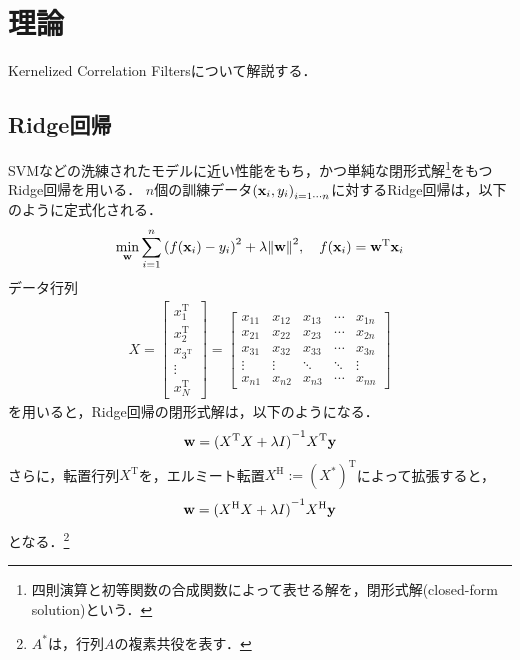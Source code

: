 \documentclass[11pt,a4j]{jarticle}
\newcommand\norm[1]{\left\lVert#1\right\rVert}
\begin{document}
  \section{理論}
    Kernelized Correlation Filters\cite{DBLP:journals/corr/HenriquesCMB14}について解説する．

    \subsection{Ridge回帰}
      SVMなどの洗練されたモデルに近い性能をもち，かつ単純な閉形式解\footnote{四則演算と初等関数の合成関数によって表せる解を，閉形式解(closed-form solution)という．}をもつRidge回帰を用いる．
      $n$個の訓練データ${({\bf x}_i, y_i)}_{i = 1 \cdots n}$に対するRidge回帰は，以下のように定式化される．
      \begin{align}
        \min_{\bf w} \sum_{i=1}^{n} { \left( f({\bf x}_i) - y_i \right) }^{2} + \lambda {\norm{ \bf w }}^{2}, ~~~
        f({\bf x}_i) = {\bf w}^{\mathrm{T}} {\bf x}_i
      \end{align}
      データ行列
      \begin{align}
        X = 
        \left[
          \begin{array}{c}
            x_{1}^{\mathrm{T}} \\
            x_{2}^{\mathrm{T}} \\
            x_{3^{\mathrm{T}}} \\
            \vdots \\
            x_{N}^{\mathrm{T}} 
          \end{array}
        \right]
        =
        \left[
          \begin{array}{ccccc}
            x_{11} & x_{12} & x_{13} & \cdots & x_{1n} \\
            x_{21} & x_{22} & x_{23} & \cdots & x_{2n} \\
            x_{31} & x_{32} & x_{33} & \cdots & x_{3n} \\
            \vdots&\vdots&\ddots&\ddots&\vdots \\
            x_{n1} & x_{n2} & x_{n3} & \cdots & x_{nn} 
          \end{array}
        \right]
      \end{align}
      を用いると，Ridge回帰の閉形式解は，以下のようになる．
      \begin{align}
        {\bf w} = { ({X}^{\mathrm{T}} X + \lambda I) }^{-1} {X}^{\mathrm{T}} {\bf y}
      \end{align}
      さらに，転置行列$X^{\mathrm{T}}$を，エルミート転置$X^{\mathrm{H}} := {(X^{*})}^{\mathrm{T}}$によって拡張すると，
      \begin{align}
        {\bf w} = { ({X}^{\mathrm{H}} X + \lambda I) }^{-1} {X}^{\mathrm{H}} {\bf y}
      \end{align}
      となる．\footnote{$A^{*}$は，行列$A$の複素共役を表す．}
\end{document}
